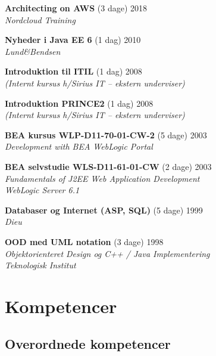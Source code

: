 \documentclass[a4paper,11pt]{article}
\begin{document}
\textbf{Architecting on AWS} \hfill (3 dage) 2018 \\
\textsl{Nordcloud Training}

\textbf{Nyheder i Java EE 6} \hfill (1 dag) 2010 \\
\textsl{Lund\&Bendsen}

\textbf{Introduktion til ITIL} \hfill (1 dag) 2008 \\
\textsl{(Internt kursus h/Sirius IT -- ekstern underviser)}

\textbf{Introduktion PRINCE2} \hfill (1 dag) 2008 \\
\textsl{(Internt kursus h/Sirius IT -- ekstern underviser)}

\textbf{BEA kursus WLP-D11-70-01-CW-2} \hfill (5 dage) 2003 \\
\textsl{Development with BEA WebLogic Portal}

\textbf{BEA selvstudie WLS-D11-61-01-CW} \hfill (2 dage) 2003 \\
\textsl{Fundamentals of J2EE Web Application Development\\WebLogic Server 6.1}


\textbf{Databaser og Internet (ASP, SQL)} \hfill (5 dage) 1999 \\
\textsl{Dieu}

\textbf{OOD med UML notation} \hfill (3 dage) 1998 \\
\textsl{Objektorienteret Design og C++ / Java Implementering\\Teknologisk Institut}


\section*{Kompetencer}

\subsection*{Overordnede kompetencer}
\end{document}
